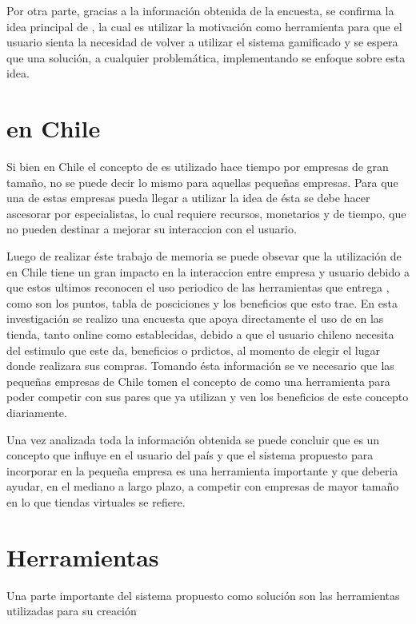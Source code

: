 Por otra parte, gracias a la información obtenida de la encuesta, se confirma la
idea principal de {\gam}, la cual es utilizar la motivación como herramienta para
que el usuario sienta la necesidad de volver a utilizar el sistema gamificado y
se espera que una solución, a cualquier problemática, implementando {\gam} se
enfoque sobre esta idea.

\section{{\GAM} en Chile}

Si bien en Chile el concepto de {\gam} es utilizado hace tiempo por empresas de gran tamaño, no se
puede decir lo mismo para aquellas pequeñas empresas. Para que una de estas empresas pueda
llegar a utilizar la idea de {\gam} ésta se debe hacer ascesorar por especialistas, lo cual 
requiere recursos, monetarios y de tiempo, que no pueden destinar a mejorar su interaccion con el usuario. 

Luego de realizar éste trabajo de memoria se puede obsevar que la utilización de {\gam} en Chile tiene 
un gran impacto en la interaccion entre empresa y usuario debido a que estos ultimos reconocen el uso
periodico de las herramientas que entrega {\gam}, como son los puntos, tabla de posciciones y los 
beneficios que esto trae. 
En esta investigación se realizo una encuesta que apoya directamente el uso de {\gam} en las tienda, tanto
online como establecidas, debido a que el usuario chileno necesita del estimulo que este da, beneficios o prdictos, 
al momento de elegir el lugar donde realizara sus compras. Tomando ésta información se ve necesario que las
pequeñas empresas de Chile tomen el concepto de {\gam} como una herramienta para poder competir con sus 
pares que ya utilizan {\gam} y ven los beneficios de este concepto diariamente.

Una vez analizada toda la información obtenida se puede concluir que {\gam} es un concepto que influye 
en el usuario del país y que el sistema propuesto para incorporar {\gam} en la pequeña empresa
es una herramienta importante y que deberia ayudar, en el mediano a largo plazo, a competir con empresas
de mayor tamaño en lo que tiendas virtuales se refiere. 

\section{Herramientas}

Una parte importante del sistema propuesto como solución son las herramientas utilizadas para su creación


